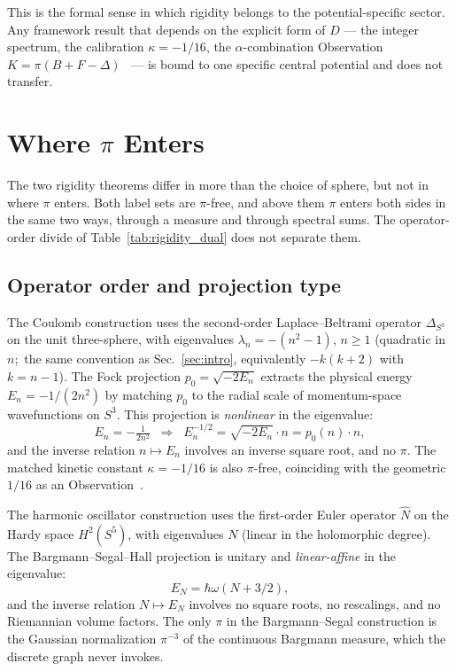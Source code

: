 \documentclass[twocolumn,pra,amsmath,amssymb,superscriptaddress]{revtex4-2}
\begin{document}
This is the formal sense in which rigidity belongs to the
potential-specific sector.  Any framework result that depends on
the explicit form of $D$ --- the integer spectrum, the calibration
$\kappa = -1/16$, the $\alpha$-combination Observation
$K = \pi(B + F - \Delta)$~\cite{paper2_alpha} --- is bound to one
specific central potential and does not transfer.

\section{Where $\pi$ Enters}
\label{sec:transcendental}

The two rigidity theorems differ in more than the choice of sphere,
but not in where $\pi$ enters.  Both label sets are $\pi$-free, and
above them $\pi$ enters both sides in the same two ways, through a
measure and through spectral sums.  The operator-order divide of
Table~\ref{tab:rigidity_dual} does not separate them.

\subsection{Operator order and projection type}

The Coulomb construction uses the second-order Laplace--Beltrami
operator $\Delta_{S^3}$ on the unit three-sphere, with eigenvalues
$\lambda_n = -(n^2 - 1)$, $n \ge 1$ (quadratic in $n$;\ the same
convention as Sec.~\ref{sec:intro}, equivalently $-k(k+2)$ with
$k = n - 1$).  The Fock projection
$p_0 = \sqrt{-2 E_n}$ extracts the physical energy $E_n = -1/(2n^2)$
by matching $p_0$ to the radial scale of momentum-space wavefunctions
on $S^3$.  This projection is \emph{nonlinear} in the eigenvalue:
\[
  E_n = -\tfrac{1}{2 n^2}
  \;\;\Longrightarrow\;\;
  E_n^{-1/2} = \sqrt{-2 E_n} \cdot n
  = p_0(n) \cdot n,
\]
and the inverse relation $n \mapsto E_n$ involves an inverse square
root, and no $\pi$.  The matched kinetic constant $\kappa = -1/16$ is
also $\pi$-free, coinciding with the geometric $1/16$ as an
Observation~\cite{paper7,paper24}.

The harmonic oscillator construction uses the first-order Euler
operator $\hat{N}$ on the Hardy space $H^2(S^5)$, with eigenvalues
$N$ (linear in the holomorphic degree).  The
Bargmann--Segal--Hall projection is unitary and \emph{linear-affine}
in the eigenvalue:
\[
  E_N = \hbar\omega(N + 3/2),
\]
and the inverse relation $N \mapsto E_N$ involves no square roots,
no rescalings, and no Riemannian volume factors.  The only $\pi$ in
the Bargmann--Segal construction is the Gaussian normalization
$\pi^{-3}$ of the continuous Bargmann measure, which the discrete
graph never invokes.
\end{document}
